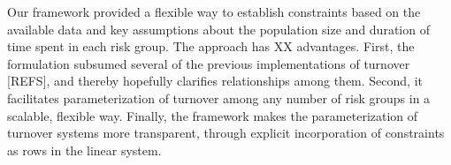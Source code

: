Our framework %
provided a flexible way to establish constraints based on the available data and
key assumptions about the population size and duration of time spent in each risk group. 
The approach has XX advantages.	%
First, the formulation subsumed several of the previous implementations of turnover [REFS],		%
and thereby hopefully clarifies relationships among them.  %
Second, it facilitates parameterization of turnover among any number of risk groups
in a scalable, flexible way.									%
Finally, the framework makes the parameterization of turnover systems more transparent,
through explicit incorporation of constraints as rows in the linear system.	%

